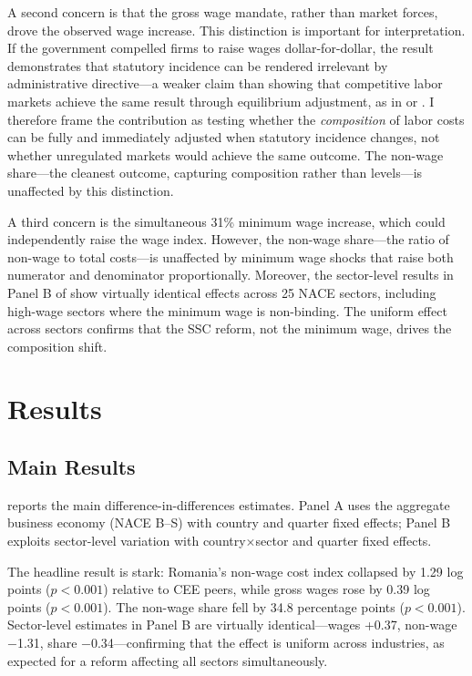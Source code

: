 \documentclass[12pt]{article}
\begin{document}
A second concern is that the gross wage mandate, rather than market forces, drove the observed wage increase. This distinction is important for interpretation. If the government compelled firms to raise wages dollar-for-dollar, the result demonstrates that statutory incidence can be rendered irrelevant by administrative directive---a weaker claim than showing that competitive labor markets achieve the same result through equilibrium adjustment, as in \citet{gruber1997incidence} or \citet{saez2019payroll}. I therefore frame the contribution as testing whether the \emph{composition} of labor costs can be fully and immediately adjusted when statutory incidence changes, not whether unregulated markets would achieve the same outcome. The non-wage share---the cleanest outcome, capturing composition rather than levels---is unaffected by this distinction.

A third concern is the simultaneous 31\% minimum wage increase, which could independently raise the wage index. However, the non-wage share---the ratio of non-wage to total costs---is unaffected by minimum wage shocks that raise both numerator and denominator proportionally. Moreover, the sector-level results in Panel B of  show virtually identical effects across 25 NACE sectors, including high-wage sectors where the minimum wage is non-binding. The uniform effect across sectors confirms that the SSC reform, not the minimum wage, drives the composition shift.


\section{Results}

\subsection{Main Results}

 reports the main difference-in-differences estimates. Panel A uses the aggregate business economy (NACE B--S) with country and quarter fixed effects; Panel B exploits sector-level variation with country$\times$sector and quarter fixed effects.

The headline result is stark: Romania's non-wage cost index collapsed by 1.29 log points ($p < 0.001$) relative to CEE peers, while gross wages rose by 0.39 log points ($p < 0.001$). The non-wage share fell by 34.8 percentage points ($p < 0.001$). Sector-level estimates in Panel B are virtually identical---wages +0.37, non-wage $-$1.31, share $-$0.34---confirming that the effect is uniform across industries, as expected for a reform affecting all sectors simultaneously.
\end{document}
